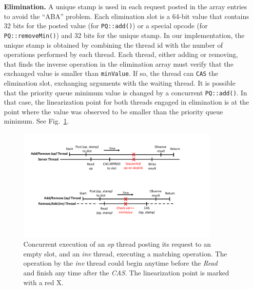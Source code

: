 \textbf{Elimination.} A unique stamp is used in each request posted in the array entries to avoid the ``ABA'' problem. %
Each elimination slot is a 64-bit value that contains 32 bits for the posted value (for \texttt{PQ::add()}) or a special opcode (for \texttt{PQ::removeMin()}) and 32 bits for the unique stamp. In our implementation, the unique stamp is obtained by combining the thread id with the number of operations performed by each thread. %
Each thread, either adding or removing, that finds the inverse operation in the elimination array must verify that the exchanged value is smaller than \texttt{minValue}. If so, the thread can \texttt{CAS} the elimination slot, exchanging arguments with the waiting thread. It is possible that the priority queue minimum value is changed by a concurrent \texttt{PQ::add()}. In that case, the linearization point for both threads engaged in  elimination is at the point where the value was observed to be smaller than the priority queue minimum. See Fig.~\ref{fig:correctness_elim}.

\begin{figure}
  \centering
  \includegraphics[width=0.9\textwidth]{img/correctness2.pdf}
\caption{Concurrent execution of an \emph{op} thread posting its request to an empty slot, and an \emph{inv} thread, executing a matching operation. The operation by the \emph{inv} thread could begin anytime before the \emph{Read} and finish any time after the \emph{CAS}. The linearization point is marked with a red X.}
\label{fig:correctness_elim}
\end{figure}

